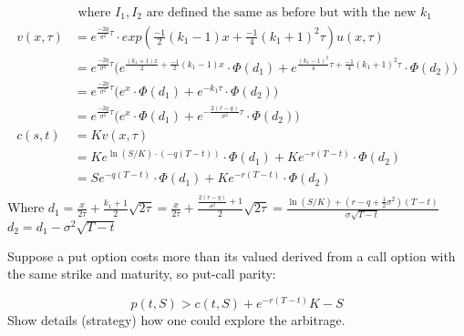 \documentclass[12pt,twoside, letter]{exam}
\theoremstyle{definition}
\begin{document}
\begin{solution}
\begin{align*}
     &\text{ where $I_1, I_2$ are defined the same as before but with the new $k_1$} \\
     v(x,\tau) &= e^{\frac{-2q}{\sigma^2}\tau}\cdot exp(\frac{-1}{2}(k_1 - 1) x + \frac{-1}{4}(k_1 + 1)^2 \tau)u(x, \tau) \\
     &= e^{\frac{-2q}{\sigma^2}\tau}\bigg(e^{\frac{(k_1 + 1)x}{2} + \frac{-1}{2}(k_1 - 1) x} \cdot \Phi(d_1) + e^{\frac{(k_1-1)^2}{4}\tau + \frac{-1}{4}(k_1 + 1)^2 \tau} \cdot \Phi(d_2) \bigg) \\
     &= e^{\frac{-2q}{\sigma^2}\tau}\bigg(e^{x} \cdot \Phi(d_1) + e^{-k_1\tau} \cdot \Phi(d_2) \bigg) \\
     &= e^{\frac{-2q}{\sigma^2}\tau}\bigg(e^{x} \cdot \Phi(d_1) + e^{-\frac{2(r-q)}{\sigma^2}\tau} \cdot \Phi(d_2) \bigg) \\
     c(s,t) &= Kv(x,\tau) \\
     &= Ke^{\ln(S/K)\cdot(-q(T-t))} \cdot \Phi(d_1) + Ke^{-r(T-t)} \cdot \Phi(d_2) \\
     &= Se^{-q(T-t)} \cdot \Phi(d_1) + Ke^{-r(T-t)} \cdot \Phi(d_2) \\
    \end{align*}
    Where $d_1 =  \frac{x}{2\tau} + \frac{k_1 + 1}{2}\sqrt{2\tau} = \frac{x}{2\tau} + \frac{\frac{2(r-q)}{\sigma^2} + 1}{2}\sqrt{2\tau} = \frac{\ln(S/K) + (r-q+\frac{1}{2}\sigma^2)(T-t)}{\sigma\sqrt{T-t}}$ \\
    $d_2 = d_1 - \sigma^2\sqrt{T-t}$
  \end{solution}

  \par{Suppose a put option costs more than its valued derived from a call option with the same strike and maturity,
  so put-call parity:}

  \begin{equation*}
    p(t,S) > c(t,S) + e^{-r(T-t)}K-S
  \end{equation*}
Show details (strategy) how one could explore the arbitrage.
\end{document}
